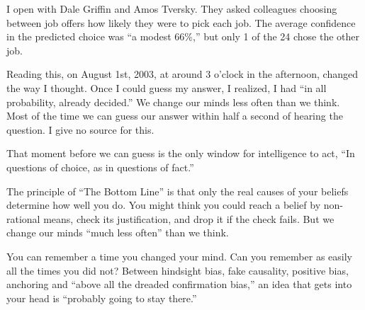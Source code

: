 
I open with Dale Griffin and Amos Tversky. They asked colleagues choosing between job offers how likely they were to pick each job. The average confidence in the predicted choice was ``a modest 66\%,'' but only 1 of the 24 chose the other job. 

Reading this, on August 1st, 2003, at around 3 o'clock in the afternoon, changed the way I thought. Once I could guess my answer, I realized, I had ``in all probability, already decided.'' We change our minds less often than we think.  Most of the time we can guess our answer within half a second of hearing the question. I give no source for this.

That moment before we can guess is the only window for intelligence to act, ``In questions of choice, as in questions of fact.'' 

The principle of ``The Bottom Line'' is that only the real causes of your beliefs determine how well you do. You might think you could reach a belief by non-rational means, check its justification, and drop it if the check fails. But we change our minds ``much less often'' than we think. 

You can remember a time you changed your mind. Can you remember as easily all the times you did not? Between hindsight bias, fake causality, positive bias, anchoring and ``above all the dreaded confirmation bias,'' an idea that gets into your head is ``probably going to stay there.'' 
